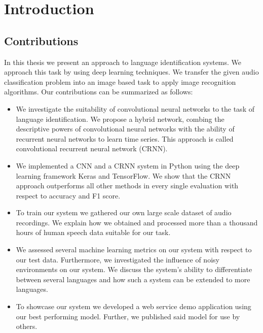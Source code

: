 \section{Introduction}




\subsection{Contributions}
In this thesis we present an approach to language identification systems. We approach this task by using deep learning techniques. We transfer the given audio classification problem into an image based task to apply image recognition algorithms. Our contributions can be summarized as follows:
\begin{itemize}
	\item We investigate the suitability of convolutional neural networks to the task of language identification. We propose a hybrid network, combing the descriptive powers of convolutional neural networks with the ability of recurrent neural networks to learn time series. This approach is called convolutional recurrent neural network (CRNN). 
	\item We implemented a CNN and a CRNN system in Python using the deep learning framework Keras and TensorFlow. We show that the CRNN approach outperforms all other methods in every single evaluation with respect to accuracy and F1 score.
	\item To train our system we gathered our own large scale dataset of audio recordings. We explain how we obtained and processed more than a thousand hours of human speech data suitable for our task.
	\item We assessed several machine learning metrics on our system with respect to our test data. Furthermore, we investigated the influence of noisy environments on our system. We discuss the system's ability to differentiate between several languages and how such a system can be extended to more languages.
	\item To showcase our system we developed a web service demo application using our best performing model. Further, we published said model for use by others.
\end{itemize} 


